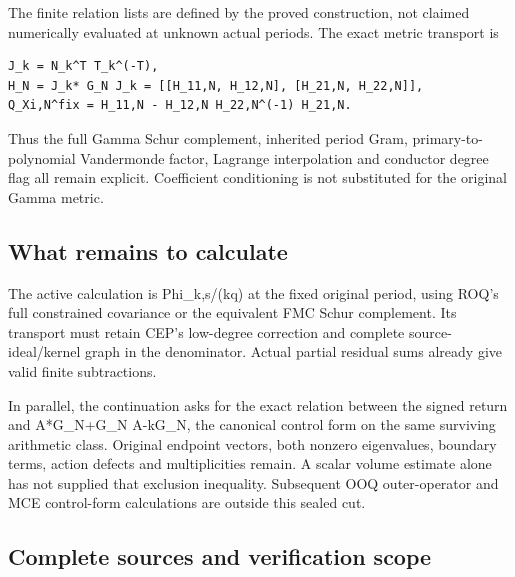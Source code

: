 \documentclass[
]{article}
\begin{document}
The finite relation lists are defined by the proved construction, not
claimed numerically evaluated at unknown actual periods. The exact
metric transport is

\begin{verbatim}
J_k = N_k^T T_k^(-T),
H_N = J_k* G_N J_k = [[H_11,N, H_12,N], [H_21,N, H_22,N]],
Q_Xi,N^fix = H_11,N - H_12,N H_22,N^(-1) H_21,N.
\end{verbatim}

Thus the full Gamma Schur complement, inherited period Gram, primary-to-
polynomial Vandermonde factor, Lagrange interpolation and conductor
degree flag all remain explicit. Coefficient conditioning is not
substituted for the original Gamma metric.

\subsection{What remains to
calculate}\label{what-remains-to-calculate-3}

The active calculation is Phi\_k,s/(kq) at the fixed original period,
using ROQ's full constrained covariance or the equivalent FMC Schur
complement. Its transport must retain CEP's low-degree correction and
complete source-ideal/kernel graph in the denominator. Actual partial
residual sums already give valid finite subtractions.

In parallel, the continuation asks for the exact relation between the
signed return and A*G\_N+G\_N A-kG\_N, the canonical control form on the
same surviving arithmetic class. Original endpoint vectors, both nonzero
eigenvalues, boundary terms, action defects and multiplicities remain. A
scalar volume estimate alone has not supplied that exclusion inequality.
Subsequent OOQ outer-operator and MCE control-form calculations are
outside this sealed cut.

\subsection{Complete sources and verification
scope}\label{complete-sources-and-verification-scope}
\end{document}
